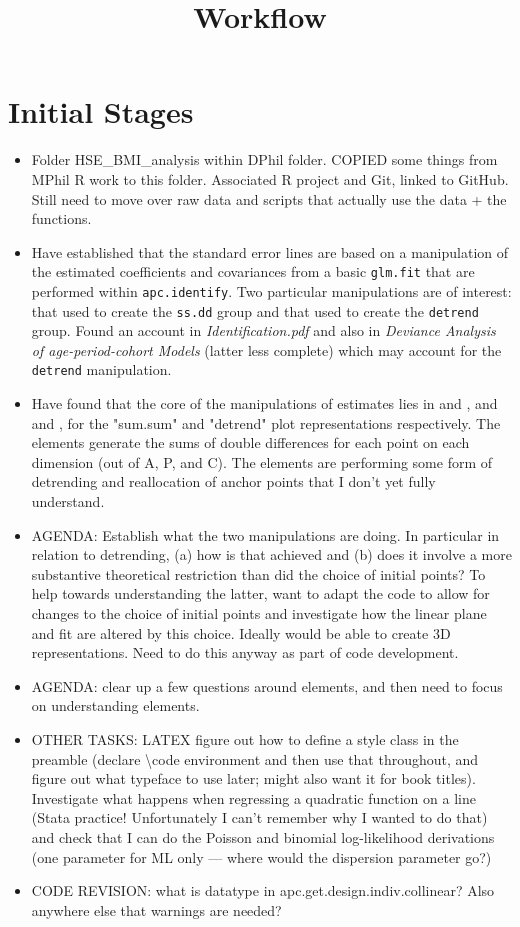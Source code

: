 \documentclass[]{article}
\title{Workflow}
\begin{document}
\maketitle
\section{Initial Stages}
\begin{itemize}
\item Folder HSE\_BMI\_analysis within DPhil folder. COPIED some things from MPhil R work to this folder. Associated R project and Git, linked to GitHub. Still need to move over raw data and scripts that actually use the data + the functions.
\item Have established that the standard error lines are based on a manipulation of the estimated coefficients and covariances from a basic \texttt{glm.fit} that are performed within \texttt{apc.identify}. Two particular manipulations are of interest: that used to create the \texttt{ss.dd} group and that used to create the \texttt{detrend} group. Found an account in \textit{Identification.pdf} and also in \textit{Deviance Analysis of age-period-cohort Models} (latter less complete) which may account for the \texttt{detrend} manipulation.
\item Have found that the core of the manipulations of estimates lies in  and , and  and , for the "sum.sum" and "detrend" plot representations respectively. The  elements generate the sums of double differences for each point on each dimension (out of A, P, and C). The  elements are performing some form of detrending and reallocation of anchor points that I don't yet fully understand.

\item AGENDA: Establish what the two manipulations are doing. In particular in relation to detrending, (a) how is that achieved and (b) does it involve a more substantive theoretical restriction than did the choice of initial points? To help towards understanding the latter, want to adapt the code to allow for changes to the choice of initial points and investigate how the linear plane and fit are altered by this choice. Ideally would be able to create 3D representations. Need to do this anyway as part of code development.
\item AGENDA: clear up a few questions around  elements, and then need to focus on understanding  elements.
\item OTHER TASKS: LATEX figure out how to define a style class in the preamble (declare \textbackslash code environment and then use that throughout, and figure out what typeface to use later; might also want it for book titles). Investigate what happens when regressing a quadratic function on a line (Stata practice! Unfortunately I can't remember why I wanted to do that) and check that I can do the Poisson and binomial log-likelihood derivations (one parameter for ML only --- where would the dispersion parameter go?)
\item CODE REVISION: what is datatype in apc.get.design.indiv.collinear? Also anywhere else that warnings are needed?
\end{itemize}
\end{document}
